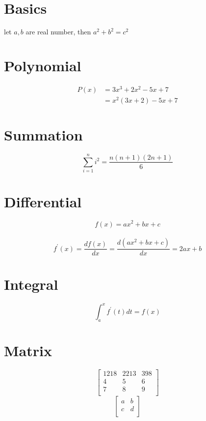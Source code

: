 \documentclass[12pt,a4paper]{article}
\begin{document}
\section{Basics}
let $a,b$ are real number, then $a^2 + b^2 = c^2$ 

\section{Polynomial}
\begin{align*}
    P(x) &= 3x^3 + 2x^2 - 5x + 7 \\
         &= x^2(3x + 2) - 5x + 7
\end{align*}

\section{Summation}
\begin{equation*}
    \sum_{i=1}^{n} i^2=\frac{n(n + 1)(2n + 1)}{6}
\end{equation*}

\section{Differential}
\begin{equation*}
    f(x)=ax^2+bx+c
\end{equation*}\\
\begin{equation*}
    f^{\prime}(x)=\frac{df(x)}{dx}=\frac{d(ax^2+bx+c)}{dx}=2ax+b 
\end{equation*}

\section{Integral}
\begin{equation*}
    \int_{a}^{x} f^{\prime}(t) dt = f(x)
\end{equation*}

\section{Matrix}
\begin{equation*}
    \left[
    \begin{array}{lcr}
        1218 & 2213 & 398 \\
        4 & 5 & 6 \\
        7 & 8 & 9 \\
    \end{array}
    \right]
\end{equation*}
\begin{equation*}
 \left[
    \begin{matrix}%
        a & b \\
        c & d \\
    \end{matrix}
    \right]
\end{equation*}
\end{document}
